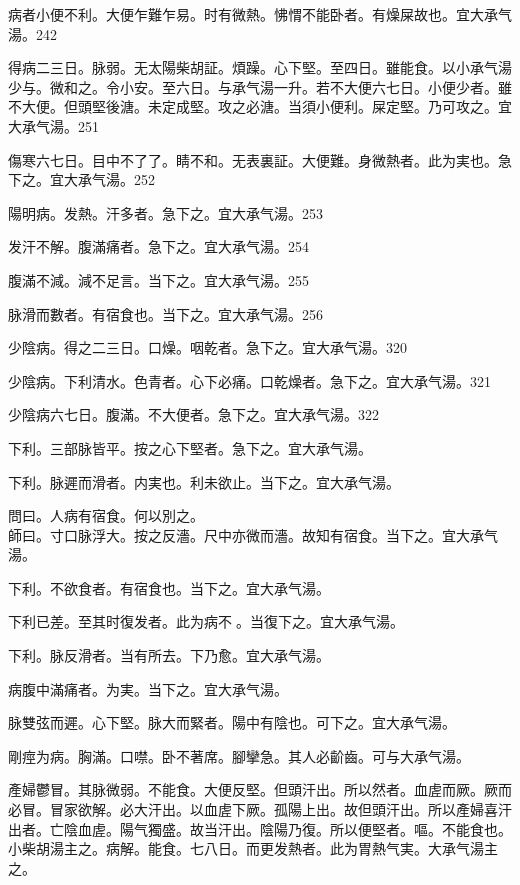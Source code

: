 病者小便不利。大便乍難乍易。时有微熱。怫㥜不能卧者。有燥屎故也。宜{\khaaitp 大}承气湯。242

得病二三日。脉弱。无太陽柴胡証。煩躁。心下堅。至四日。雖能食。以{\khaaitp 小}承气湯少与。微和之。令小安。至六日。与承气湯一升。若不大便六七日。小便少者。雖不大便。但頭堅後溏。未定成堅。攻之必溏。当須小便利。屎定堅。乃可攻之。宜{\khaaitp 大}承气湯。251

傷寒六七日。目中不了了。睛不和。无表{\khaaitp 裏}証。大便難。身微熱者。此为実也。急下之。宜{\khaaitp 大}承气湯。252

陽明病。发熱。汗多者。急下之。宜{\khaaitp 大}承气湯。253

发汗不解。腹滿痛者。急下之。宜{\khaaitp 大}承气湯。254

腹滿不減。減不足言。当下之。宜{\khaaitp 大}承气湯。255

脉滑而數者。有宿食也。当下之。宜{\khaaitp 大}承气湯。256

少陰病。得之二三日。口燥。咽乾者。急下之。宜{\khaaitp 大}承气湯。320

少陰病。{\khaaitp 下}利清水。色青者。心下必痛。口乾燥者。急下之。宜{\khaaitp 大}承气湯。321

少陰病六七日。腹滿。不大便者。急下之。宜{\khaaitp 大}承气湯。322

下利。三部脉皆平。按之心下堅者。急下之。宜{\khaaitp 大}承气湯。

下利。脉遲而滑者。{\khaaitp 内}実也。利未欲止。当下之。宜{\khaaitp 大}承气湯。

問曰。人病有宿食。何以別之。\\
師曰。寸口脉浮大。按之反濇。尺中亦微而濇。故知有宿食。当下之。宜{\khaaitp 大}承气湯。

下利。不欲食者。有宿食也。当下之。宜{\khaaitp 大}承气湯。

下利{\khaaitp 已}差。至其时復发者。此为病不{\sungtpii 𥁞}。当復下之。宜{\khaaitp 大}承气湯。

下利。脉反滑{\khaaitp 者}。当有所去。下乃愈。宜大承气湯。

病腹中滿痛者。为実。当下之。宜大承气湯。

脉雙弦而遲。心下堅。脉大而緊者。陽中有陰也。可下之。宜{\khaaitp 大}承气湯。

{\khaaitp 剛}痙为病。胸滿。口噤。卧不著席。腳攣急。其人必齘齒。可与大承气湯。

產婦鬱{\khaaitp 冒}。其脉微弱。不能食。大便反堅。但頭汗出。所以然者。血虗而厥。厥而必冒。冒家欲解。必大汗出。以血虗下厥。孤陽上出。故但頭汗出。所以產婦喜汗出者。亡陰血虗。陽气獨盛。故当汗出。陰陽乃復。所以便堅者。嘔。不能食也。小柴胡湯主之。病解。能食。七八日。而更发熱者。此为胃熱气実。大承气湯主之。{\wuben}

